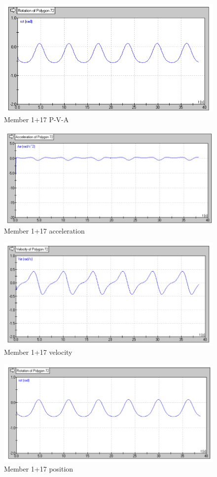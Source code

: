 \documentclass{article}
\begin{document}
\begin{figure}[H]
    \centering
    \includegraphics[width=0.7\linewidth]{Images/mem 1+17 Rot.png}
    \caption{Member 1+17 P-V-A}
\end{figure}

\begin{figure}[H]
    \centering
    \includegraphics[width=0.7\linewidth]{Images/mem 1+17 acc.png}
    \caption{Member 1+17 acceleration}
\end{figure}

\begin{figure}[H]
    \centering
    \includegraphics[width=0.7\linewidth]{Images/mem 1+17 vel.png}
    \caption{Member 1+17 velocity}
\end{figure}

\begin{figure}[H]
    \centering
    \includegraphics[width=0.7\linewidth]{Images/mem 1+17 pos.png}
    \caption{Member 1+17 position}
\end{figure}
\end{document}
